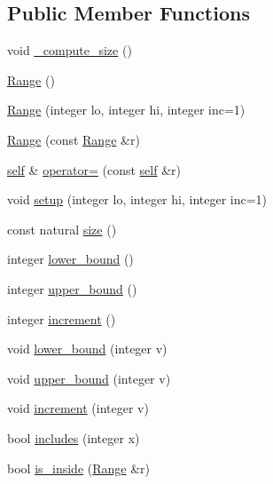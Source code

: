 \subsection*{Public Member Functions}
\begin{DoxyCompactItemize}
\item 
void \hyperlink{classez_1_1essential_1_1Range_ad1f022871185dd430d303ab4f049866b}{\+\_\+compute\+\_\+size} ()
\item 
\hyperlink{classez_1_1essential_1_1Range_ae594ee2956dd1baf07e78d988a51da29}{Range} ()
\item 
\hyperlink{classez_1_1essential_1_1Range_ac13f4357a3e32efad65877d279edcb41}{Range} (integer lo, integer hi, integer inc=1)
\item 
\hyperlink{classez_1_1essential_1_1Range_a5f5a5db6fce8c222c79ae6ea8b836f46}{Range} (const \hyperlink{classez_1_1essential_1_1Range}{Range} \&r)
\item 
\hyperlink{classez_1_1essential_1_1Range}{self} \& \hyperlink{classez_1_1essential_1_1Range_a9d5d4ba46b7d007004e1bae4c0838730}{operator=} (const \hyperlink{classez_1_1essential_1_1Range}{self} \&r)
\item 
void \hyperlink{classez_1_1essential_1_1Range_a77ce9b7d244288eb58cd7fc21b6a7973}{setup} (integer lo, integer hi, integer inc=1)
\item 
const natural \hyperlink{classez_1_1essential_1_1Range_a4dbc591c1c1979fa4691da3a6bb2c4f6}{size} ()
\item 
integer \hyperlink{classez_1_1essential_1_1Range_a7ac883fa331366305a79b41a08d6e54f}{lower\+\_\+bound} ()
\item 
integer \hyperlink{classez_1_1essential_1_1Range_a9310aea152b51bfe658afecc318c84b6}{upper\+\_\+bound} ()
\item 
integer \hyperlink{classez_1_1essential_1_1Range_ab31db0c8d2d5339b5146f9a203ced4a4}{increment} ()
\item 
void \hyperlink{classez_1_1essential_1_1Range_a9e2c671e2ce1fbce8aa01f5f515147a9}{lower\+\_\+bound} (integer v)
\item 
void \hyperlink{classez_1_1essential_1_1Range_ac02c931b80980f50048ca5ad9c0dbcf3}{upper\+\_\+bound} (integer v)
\item 
void \hyperlink{classez_1_1essential_1_1Range_af5cb29600994f95a5d7042c6163c3da3}{increment} (integer v)
\item 
bool \hyperlink{classez_1_1essential_1_1Range_a63321b30a6d5d626de3653218c278847}{includes} (integer x)
\item 
bool \hyperlink{classez_1_1essential_1_1Range_aef949951451297fd3e9d96f8cd773e97}{is\+\_\+inside} (\hyperlink{classez_1_1essential_1_1Range}{Range} \&r)

\end{DoxyCompactItemize}
